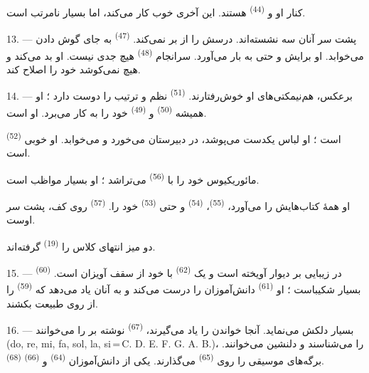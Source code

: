 کنار او  و  \textsuperscript{(44)}
هستند. این آخری خوب کار می‌کند، اما  بسیار نامرتب است.

13. --- پشت سر آنان سه  نشسته‌اند.  درسش
را از بر نمی‌کند.  \textsuperscript{(47)} به جای گوش
دادن می‌خوابد.  او برایش  و حتی
 به بار می‌آورد. سرانجام 
\textsuperscript{(48)} هیچ جدی نیست. او بد  می‌کند و هیچ
نمی‌کوشد خود را اصلاح کند.

14. --- برعکس، هم‌نیمکتی‌های او خوش‌رفتارند. 
\textsuperscript{(51)} نظم و ترتیب را دوست دارد ؛ او همیشه
 \textsuperscript{(50)} و 
\textsuperscript{(49)} خود را به کار می‌برد. او  است.

 \textsuperscript{(52)}  است ؛ او
لباس یکدست می‌پوشد، در دبیرستان می‌خورد و می‌خوابد. او 
خوبی است.

مائوریکیوس  خود را با 
\textsuperscript{(56)} می‌تراشد ؛ او بسیار مواظب است.

او همهٔ کتاب‌هایش را می‌آورد،  \textsuperscript{(55)}،
 \textsuperscript{(54)} و حتی 
\textsuperscript{(53)} خود را. 
\textsuperscript{(57)} روی کف، پشت سر اوست.

دو میز انتهای کلاس را  \textsuperscript{(19)}
گرفته‌اند.

\VUsaut{4.6mm}
\VUsaut{3.4mm}

15. --- در   زیبایی بر دیوار
آویخته است و یک  \textsuperscript{(62)} با 
خود از سقف آویزان است.  \textsuperscript{(60)} بسیار
شکیباست ؛ او  \textsuperscript{(61)} دانش‌آموزان را
درست می‌کند و به آنان یاد می‌دهد که 
\textsuperscript{(59)} را از روی طبیعت بکشند.

16. ---  بسیار دلکش می‌نماید. آنجا خواندن
 را یاد می‌گیرند،  \textsuperscript{(67)}
نوشته بر  را می‌خوانند (do, re, mi, fa, sol, la,
si\,=\,C. D. E. F. G. A. B.)،  را می‌شناسند و
 دلنشین می‌خوانند. برگه‌های موسیقی را روی  \textsuperscript{(65)} می‌گذارند. یکی از دانش‌آموزان  \textsuperscript{(64)} و 
\textsuperscript{(66)}  \textsuperscript{(68)}.

